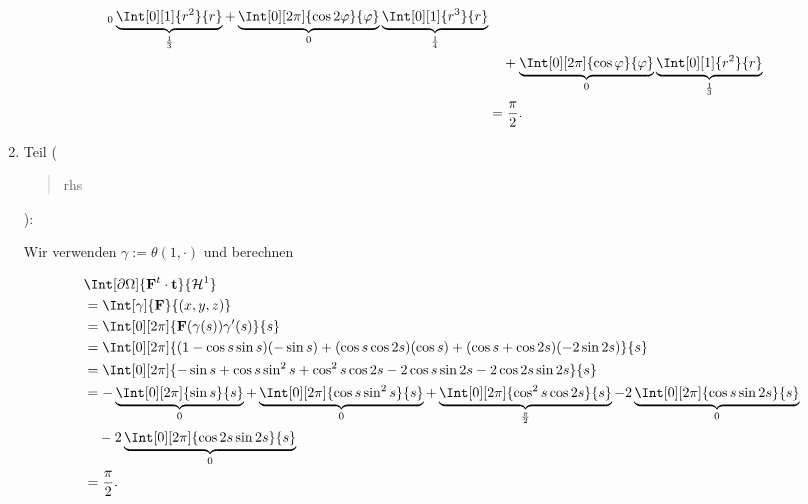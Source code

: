 \begin{solution}
\begin{enumerate}[label = \arabic*.]
\begin{align*}
{        }_0
        \underbrace
        {
            \Int[0][1]
            {
                r^2
            }{r}
        }_\frac{1}{3}
        +
        \underbrace
        {
            \Int[0][2 \pi]
            {
                \cos{2 \varphi}
            }{\varphi}
        }_0
        \underbrace
        {
            \Int[0][1]
            {
                r^3
            }{r}
        }_\frac{1}{4} \\
        & \quad
        +
        \underbrace
        {
            \Int[0][2 \pi]
            {
                \cos \varphi
            }{\varphi}
        }_0
        \underbrace
        {
            \Int[0][1]
            {
                r^2
            }{r}
        }_\frac{1}{3} \\
        & =
        \frac{\pi}{2}.
    \end{align*}
    
    \item Teil (\blockquote{rhs}):

    Wir verwenden $\gamma := \theta(1, \cdot)$ und berechnen

    \begin{align*}
        &
        \Int[\partial \Omega]
        {
            \mathbf F^t \cdot \mathbf t
        }{
            \mathcal H^1
        } \\
        & =
        \Int[\gamma]
        {
            \mathbf F
        }{(x, y, z)} \\
        & =
        \Int[0][2 \pi]
        {
            \mathbf F(\gamma(s)) \gamma^\prime(s)
        }{s} \\
        & =
        \Int[0][2 \pi]
        {
            (1 - \cos s \sin s)  (-\sin s)
            +
            (\cos s \cos{2 s})   (\cos s)
            +
            (\cos s + \cos{2 s}) (-2 \sin{2 s})
        }{s} \\
        & =
        \Int[0][2 \pi]
        {
            -\sin s + \cos s \sin^2 s + \cos^2 s \cos{2 s} - 2 \cos s \sin{2 s} - 2 \cos {2 s} \sin{2 s}
        }{s} \\
        & =
        -
        \underbrace
        {
            \Int[0][2 \pi]
            {
                \sin s
            }{s}
        }_0
        +
        \underbrace
        {
            \Int[0][2 \pi]
            {
                \cos s \sin^2 s
            }{s}
        }_0
        +
        \underbrace
        {
            \Int[0][2 \pi]
            {
                \cos^2 s \cos{2 s}
            }{s}
        }_\frac{\pi}{2}
        -
        2
        \underbrace
        {
            \Int[0][2 \pi]
            {
                \cos s \sin{2 s}
            }{s}
        }_0 \\
        & \quad
        -
        2
        \underbrace
        {
            \Int[0][2 \pi]
            {
                \cos{2 s} \sin{2 s}
            }{s}
        }_0 \\
        & =
        \frac{\pi}{2}.
    \end{align*}

\end{enumerate}

\end{solution}

